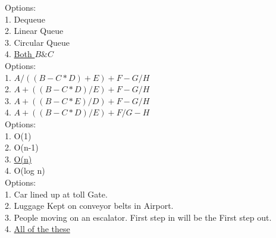 \documentclass{report}
\begin{document}
\setlength{\parindent}{0pt}
Options:\\
1. Dequeue\\
2. Linear Queue\\
3. Circular Queue\\
4. \underline{Both $B \& C$}\\

\setlength{\parindent}{0pt}
Options:\\
1. $A / ((B - C * D) + E ) + F - G / H$\\
2. \underline{$A + ((B - C * D) / E ) + F - G / H$}\\
3. $A + ((B - C * E) / D ) + F - G / H$\\
4. $A + ((B - C * D) / E ) + F / G - H$\\

\setlength{\parindent}{0pt}
Options:\\
1. O(1)\\
2. O(n-1)\\
3. \underline{O(n)}\\
4. O(log n)\\
\setlength{\parindent}{0pt}
Options:\\
1. Car lined up at toll Gate.\\
2. Luggage Kept on conveyor belts in Airport.\\
3. People moving on an escalator. First step in will be the First step out.\\
4. \underline{All of the these}\\
\newpage%
\pagebreak
\end{document}
